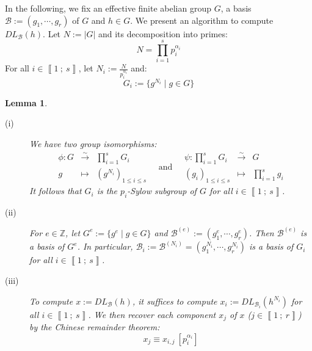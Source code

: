 \documentclass[a4paper,10pt]{report}
\theoremstyle{definition}
\theoremstyle{plain}
\newtheorem{lemma}[definition]{Lemma}
\theoremstyle{definition}
\newcommand{\Z}{\mathbb{Z}}
\newcommand{\m}[1]{\mathcal{#1}}
\renewcommand{\i}[2]{\left\llbracket #1~;~#2\right\rrbracket}
\renewcommand{\(}{\left(}
\renewcommand{\)}{\right)}
\begin{document}
In the following, we fix an effective finite abelian group $G$, a basis $\m{B}:=(g_1,\cdots, g_r)$ of $G$ and $h\in G$. We present an algorithm to compute $DL_{\m{B}}(h)$. Let $N:=|G|$ and its decomposition into primes:
\[N=\prod_{i=1}^s p_i^{\alpha_i}\]
For  all $i\in\i{1}{s}$, let $N_i:=\frac{N}{p_i^{\alpha_i}}$ and:
\[G_i:=\{g^{N_i}\mid g\in G\}\]

\begin{lemma}\label{lemma 11}
\begin{description}
\item[(i)] We have two group isomorphisms:
\[\begin{array}{rcl}
\phi : G&\overset{\sim}{\longrightarrow}&\prod_{i=1}^s G_i\\
g&\longmapsto & (g^{N_i})_{1\leq i\leq s}
\end{array} \quad \mbox{and} \quad \begin{array}{rcl}
\psi : \prod_{i=1}^s G_i &\overset{\sim}{\longrightarrow}& G\\
(g_i)_{1\leq i\leq s} &\longmapsto & \prod_{i=1}^s g_i
\end{array}\]
It follows that $G_i$ is the $p_i$-Sylow subgroup of $G$ for all $i\in\i{1}{s}$.

\item[(ii)] For $e\in\Z$, let $G^e:=\{g^e\mid g\in G\}$ and $\m{B}^{(e)}:=(g_1^e, \cdots, g_r^e)$. Then $\m{B}^{(e)}$ is a basis of $G^e$.  In particular, $\m{B}_i:=\m{B}^{(N_i)}=(g_1^{N_i},\cdots, g_r^{N_i})$ is a basis of $G_i$ for all $i\in\i{1}{s}$.

\item[(iii)] To compute $x:=DL_{\m{B}}(h)$, it suffices to compute $x_i:=DL_{\m{B}_i}(h^{N_i})$ for all $i\in\i{1}{s}$. We then recover each component $x_j$ of $x$ ($j\in\i{1}{r}$) by the Chinese remainder theorem:
\[x_j\equiv x_{i, j} \ [p_i^{\alpha_i}]\]
\end{description}
\end{lemma}
\end{document}
